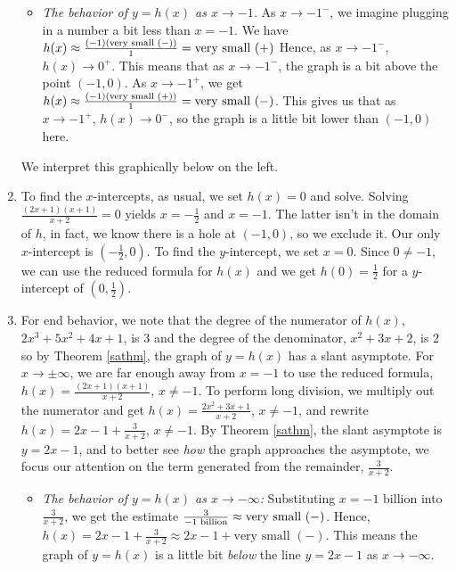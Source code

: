 \begin{ex}
\begin{enumerate}
\begin{itemize}
\item  \textit{The behavior of $y=h(x)$ as $x \rightarrow -1$.}  As $x \rightarrow -1^{-}$, we imagine plugging in a number a bit less than $x=-1$. We have $h(x) \approx \frac{(-1)(\text{\scriptsize very small $(-)$})}{1} = \text{very small $(+)$}$ Hence, as $x \rightarrow -1^{-}$, $h(x) \rightarrow 0^{+}$. This means that as $x \rightarrow -1^{-}$, the graph is a bit above the point $(-1,0)$.  As $x \rightarrow -1^{+}$, we get $h(x) \approx \frac{(-1)(\text{\scriptsize very small $(+)$})}{1} = \text{very small $(-)$}$.  This gives us that as $x \rightarrow -1^{+}$, $h(x) \rightarrow 0^{-}$, so the graph is a little bit lower than $(-1,0)$ here.  

\end{itemize}

We interpret this graphically below on the left.

\item  To find the $x$-intercepts, as usual, we set $h(x) = 0$ and solve.  Solving $\frac{(2x+1)(x+1)}{x+2}=0$ yields $x=-\frac{1}{2}$ and $x=-1$.  The latter isn't in the domain of $h$, in fact, we know there is a hole at $(-1,0)$,  so we exclude it.  Our only $x$-intercept is $\left(-\frac{1}{2}, 0\right)$.  To find the $y$-intercept, we set $x=0$.  Since $0 \neq -1$, we can use the reduced formula for $h(x)$ and we get $h(0) = \frac{1}{2}$ for a $y$-intercept of $\left(0,\frac{1}{2}\right)$.


\item  For end behavior, we note that the degree of the numerator of $h(x)$, $2x^3+5x^2+4x+1$, is $3$ and the degree of the denominator, $x^2+3x+2$, is $2$ so by Theorem \ref{sathm}, the graph of $y = h(x)$ has a slant asymptote.  For $x\rightarrow \pm \infty$, we are far enough away from $x=-1$ to use the reduced formula, $h(x) = \frac{(2x+1)(x+1)}{x+2}$, $x \neq -1$.  To perform long division, we multiply out the numerator and get $h(x) = \frac{2x^2+3x+1}{x+2}$, $x \neq -1$, and rewrite $h(x) = 2x-1+\frac{3}{x+2}$, $x \neq -1$.  By Theorem \ref{sathm}, the slant asymptote is $y = 2x-1$, and to better see \textit{how} the graph approaches the asymptote, we focus our attention on the term generated from the remainder, $\frac{3}{x+2}$.

\begin{itemize}

\item  \textit{The behavior of $y=h(x)$ as $x \rightarrow -\infty$:} Substituting  $x = \text{$-1$ billion}$ into $\frac{3}{x+2}$, we get the estimate $\frac{3}{\text{\scriptsize $-1$ billion}} \approx \text{very small $(-)$}$.  Hence, $h(x) = 2x-1+\frac{3}{x+2} \approx 2x-1 + \text{very small $(-)$}$.  This means the graph of $y=h(x)$ is a little bit \textit{below} the line $y=2x-1$ as $x \rightarrow -\infty$.


\end{itemize}
\end{enumerate}
\end{ex}
